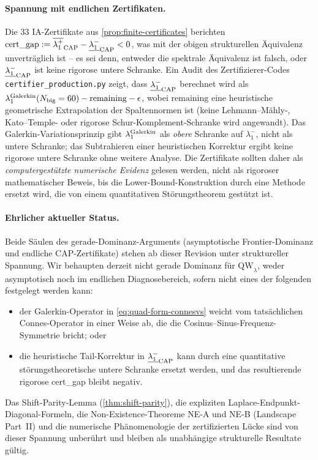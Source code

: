\documentclass[11pt,a4paper]{article}
\theoremstyle{remark}
\theoremstyle{plain}
\newcommand{\QW}{\mathrm{QW}}
\begin{document}
\paragraph{Spannung mit endlichen Zertifikaten.}
Die 33 IA-Zertifikate aus \cref{prop:finite-certificates} berichten $\text{cert\_gap} := \overline{\lambda_1^+}_{\rm CAP} - \underline{\lambda_1^-}_{\rm CAP} < 0$, was mit der obigen strukturellen Äquivalenz unverträglich ist -- es sei denn, entweder die spektrale Äquivalenz ist falsch, oder $\underline{\lambda_1^-}_{\rm CAP}$ ist keine rigorose untere Schranke. Ein Audit des Zertifizierer-Codes \texttt{certifier\_production.py} zeigt, dass $\underline{\lambda_1^-}_{\rm CAP}$ berechnet wird als $\lambda_1^{\rm Galerkin}(N_{\rm big}=60) - \text{remaining} - \epsilon$, wobei $\text{remaining}$ eine heuristische geometrische Extrapolation der Spaltennormen ist (keine Lehmann--Mähly-, Kato--Temple- oder rigorose Schur-Komplement-Schranke wird angewandt). Das Galerkin-Variationsprinzip gibt $\lambda_1^{\rm Galerkin}$ als \emph{obere} Schranke auf $\lambda_1^-$, nicht als untere Schranke; das Subtrahieren einer heuristischen Korrektur ergibt keine rigorose untere Schranke ohne weitere Analyse. Die Zertifikate sollten daher als \emph{computergestützte numerische Evidenz} gelesen werden, nicht als rigoroser mathematischer Beweis, bis die Lower-Bound-Konstruktion durch eine Methode ersetzt wird, die von einem quantitativen Störungstheorem gestützt ist.

\paragraph{Ehrlicher aktueller Status.} Beide Säulen des gerade-Dominanz-Arguments (asymptotische Frontier-Dominanz und endliche CAP-Zertifikate) stehen ab dieser Revision unter struktureller Spannung. Wir behaupten derzeit nicht gerade Dominanz für $\QW_\lambda$, weder asymptotisch noch im endlichen Diagnosebereich, sofern nicht eines der folgenden festgelegt werden kann:
\begin{itemize}[leftmargin=*]
  \item der Galerkin-Operator in \cref{eq:quad-form-connesvs} weicht vom tatsächlichen Connes-Operator in einer Weise ab, die die Cosinus--Sinus-Frequenz-Symmetrie bricht; oder
  \item die heuristische Tail-Korrektur in $\underline{\lambda_1^-}_{\rm CAP}$ kann durch eine quantitative störungstheoretische untere Schranke ersetzt werden, und das resultierende rigorose cert\_gap bleibt negativ.
\end{itemize}
Das Shift-Parity-Lemma (\cref{thm:shift-parity}), die expliziten Laplace-Endpunkt-Diagonal-Formeln, die Non-Existence-Theoreme NE-A und NE-B (Landscape Part~II) und die numerische Phänomenologie der zertifizierten Lücke sind von dieser Spannung unberührt und bleiben als unabhängige strukturelle Resultate gültig.
\end{document}
